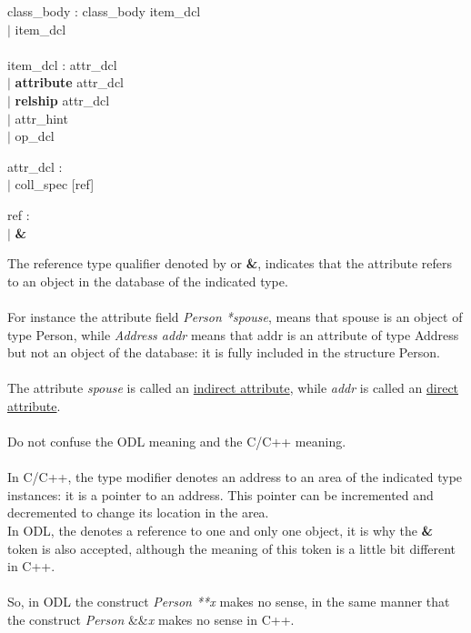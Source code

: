 \begin{tabbing}
\grindent
class\_body \> : class\_body item\_dcl\\
\> $|$ item\_dcl\\
\\
item\_dcl \> : attr\_dcl\\
\> $|$ {\bf attribute} attr\_dcl\\
\> $|$ {\bf relship} attr\_dcl\\
\> $|$ attr\_hint\\
\> $|$ op\_dcl
\end{tabbing}


\begin{tabbing}
\grindent
attr\_dcl \> : \ident [ref] \ident [array] [inverse] {\bf ;}\\
\> $|$ coll\_spec [ref] \ident [array] [inverse] {\bf ;}
\end{tabbing}

\begin{tabbing}
\grindent
ref \> : {\bf *}\\
\> $|$ {\bf \&}
\end{tabbing}
The reference type qualifier denoted by {\bf *} or {\bf \&}, indicates that the
attribute refers to an object in the database of the indicated type.
\\
\\
For instance the attribute field \emph{Person *spouse}, means that spouse
is an object of type Person, while \emph{Address addr} means that addr
is an attribute of type Address but not an object of the database: it is
fully included in the structure Person.
\\
\\
The attribute \emph{spouse} is called an \underline{indirect attribute},
while \emph{addr} is called an \underline{direct attribute}.
\\
\\
Do not confuse the {\bf *} ODL meaning and the {\bf *} C/C++ meaning.
\\
\\
In C/C++, the {\bf *} type modifier denotes an address to an area of the
indicated type instances: it is a pointer to an address. This pointer
can be incremented and decremented to change its location in the area.
\\
In ODL, the {\bf *} denotes a reference to one and only one object, it is why
the {\bf \&} token is also accepted, although the meaning of this token
is a little bit different in C++.
\\
\\
So, in ODL the construct \emph{Person **x} makes no sense, in the same
manner that the construct \emph{Person} \&\&\emph{x} makes no sense in C++.


